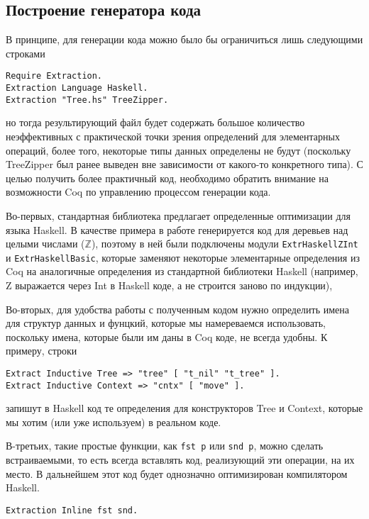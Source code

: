 
\subsection{Построение генератора кода}
В принципе, для генерации кода можно было бы ограничиться лишь следующими строками
\begin{Verbatim}[fontsize=\small]
Require Extraction.
Extraction Language Haskell.
Extraction "Tree.hs" TreeZipper.
\end{Verbatim}
но тогда результирующий файл будет содержать большое количество неэффективных с практической точки зрения определений для элементарных операций, более того, некоторые типы данных определены не будут (поскольку TreeZipper был ранее выведен вне зависимости от какого-то конкретного типа). С целью получить более практичный код, необходимо обратить внимание на возможности Coq по управлению процессом генерации кода.

Во-первых, стандартная библиотека предлагает определенные оптимизации для языка Haskell. В качестве примера в работе генерируется код для деревьев над целыми числами ($\mathbb{Z}$), поэтому в ней были подключены модули \texttt{ExtrHaskellZInt} и \texttt{ExtrHaskellBasic}, которые заменяют некоторые элементарные определения из Coq на аналогичные определения из стандартной библиотеки Haskell (например, Z выражается через Int в Haskell коде, а не строится заново по индукции),

Во-вторых, для удобства работы с полученным кодом нужно определить имена для структур данных и фунцкий, которые мы намереваемся использовать, поскольку имена, которые были им даны в Coq коде, не всегда удобны. К примеру, строки
\begin{Verbatim}[fontsize=\small]
Extract Inductive Tree => "tree" [ "t_nil" "t_tree" ].
Extract Inductive Context => "cntx" [ "move" ].
\end{Verbatim}
запишут в Haskell код те определения для конструкторов Tree и Context, которые мы хотим (или уже используем) в реальном коде. 

В-третьих, такие простые функции, как \texttt{fst p} или \texttt{snd p}, можно сделать встраиваемыми, то есть всегда вставлять код, реализующий эти операции, на их место. В дальнейшем этот код будет однозначно оптимизирован компилятором Haskell.
\begin{Verbatim}[fontsize=\small]
Extraction Inline fst snd.
\end{Verbatim}

\newpage

\Conc


